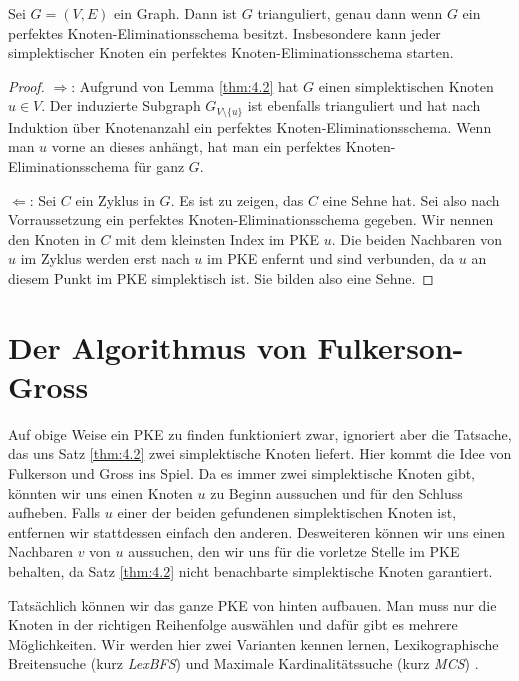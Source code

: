 \documentclass[../main.tex]{subfiles}
\begin{document}
\begin{satz} \label{thm:tri_PKE}
    Sei $G = (V, E)$ ein Graph. Dann ist $G$ trianguliert, genau dann wenn $G$ ein perfektes Knoten-Eliminationsschema besitzt. Insbesondere kann jeder simplektischer Knoten ein perfektes Knoten-Eliminationsschema starten.
\end{satz}
\begin{proof}
    $\Rightarrow$: Aufgrund von Lemma \ref{thm:4.2} hat $G$ einen simplektischen Knoten $u \in V$. Der induzierte Subgraph $G_{V \setminus \{u\}}$ ist ebenfalls trianguliert und hat nach Induktion über Knotenanzahl ein perfektes Knoten-Eliminationsschema. Wenn man $u$ vorne an dieses anhängt, hat man ein perfektes Knoten-Eliminationsschema für ganz $G$.
    
    $\Leftarrow$: Sei $C$ ein Zyklus in $G$. Es ist zu zeigen, das $C$ eine Sehne hat. Sei also nach Vorraussetzung ein perfektes Knoten-Eliminationsschema gegeben. Wir nennen den Knoten in $C$ mit dem kleinsten Index im PKE $u$. Die beiden Nachbaren von $u$ im Zyklus werden erst nach $u$ im PKE enfernt und sind verbunden, da $u$ an diesem Punkt im PKE simplektisch ist. Sie bilden also eine Sehne.
\end{proof}    

\section{Der Algorithmus von Fulkerson-Gross}

Auf obige Weise ein PKE zu finden funktioniert zwar, ignoriert aber die Tatsache, das uns Satz \ref{thm:4.2} zwei simplektische Knoten liefert. Hier kommt die Idee von Fulkerson und Gross ins Spiel. Da es immer zwei simplektische Knoten gibt, könnten wir uns einen Knoten $u$ zu Beginn aussuchen und für den Schluss aufheben. Falls $u$ einer der beiden gefundenen simplektischen Knoten ist, entfernen wir stattdessen einfach den anderen. Desweiteren können wir uns einen Nachbaren $v$ von $u$ aussuchen, den wir uns für die vorletze Stelle im PKE behalten, da Satz \ref{thm:4.2} nicht benachbarte simplektische Knoten garantiert.

Tatsächlich können wir das ganze PKE von hinten aufbauen. Man muss nur die Knoten in der richtigen Reihenfolge auswählen und dafür gibt es mehrere Möglichkeiten. Wir werden hier zwei Varianten kennen lernen, Lexikographische Breitensuche (kurz \emph{LexBFS})  und Maximale Kardinalitätssuche (kurz \emph{MCS}) .
\end{document}
